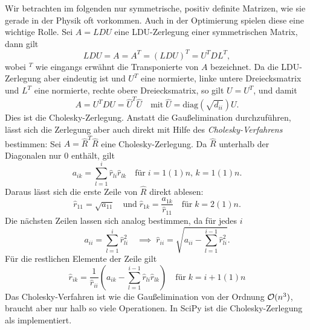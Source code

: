 Wir betrachten im folgenden nur symmetrische, positiv definite
Matrizen, wie sie gerade in der Physik oft vorkommen. Auch in der
Optimierung spielen diese eine wichtige Rolle. Sei $A=LDU$ eine
LDU-Zerlegung einer symmetrischen Matrix, dann gilt
\begin{equation}
  LDU = A = A^T = (LDU)^T = U^T D L^T,
\end{equation}
wobei $^T$ wie eingangs erwähnt die Transponierte von $A$ bezeichnet.
Da die LDU-Zerlegung aber eindeutig ist und $U^T$ eine normierte,
linke untere Dreiecksmatrix und $L^T$ eine normierte, rechte obere
Dreiecksmatrix, so gilt $U=U^T$, und damit
\begin{equation}
  A = U^TDU = \widehat{U}^T\widehat{U} \quad\text{mit}\; \widehat{U}=\text{diag}(\sqrt{d_{ii}})U.
\end{equation}
Dies ist die Cholesky-Zerlegung. Anstatt die Gaußelimination
durchzuführen, lässt sich die Zerlegung aber auch direkt mit Hilfe des
\emph{Cholesky-Verfahrens} bestimmen: Sei
$A=\widehat{R}^T\widehat{R}$ eine Cholesky-Zerlegung.
Da $\widehat{R}$ unterhalb der Diagonalen nur 0 enthält, gilt
\begin{equation}
  a_{ik} = \sum_{l=1}^{i} \hat{r}_{li}\hat{r}_{lk} \quad\text{für}\;
  i=1(1)n,\,k=1(1)n.
\end{equation}
Daraus lässt sich die erste Zeile von $\widehat{R}$ direkt ablesen:
\begin{equation}
\hat{r}_{11} = \sqrt{a_{11}}\quad\text{und}\;
\hat{r}_{1k} = \frac{a_{1k}}{\hat{r}_{11}} \quad\text{für}\;k=2(1)n.
\end{equation}
Die nächsten Zeilen lassen sich analog bestimmen, da für jedes $i$
\begin{equation}
  a_{ii} = \sum_{l=1}^{i} \hat{r}_{li}^2\quad\implies\;
  \hat{r}_{ii} = \sqrt{a_{ii} - \sum_{l=1}^{i-1} \hat{r}_{li}^2}.
\end{equation}
Für die restlichen Elemente der Zeile gilt
\begin{equation}
  \hat{r}_{ik} = \frac{1}{\hat{r}_{ii}}\left(a_{ik} - \sum_{l=1}^{i-1}\hat{r}_{li}\hat{r}_{lk}\right) \quad\text{für}\;k=i+1(1)n
\end{equation}
Das Cholesky-Verfahren ist wie die Gaußelimination von der Ordnung
$\mathcal O(n^3)$, braucht aber nur halb so viele Operationen. In SciPy ist die
Cholesky-Zerlegung als  implementiert.

\section{}

